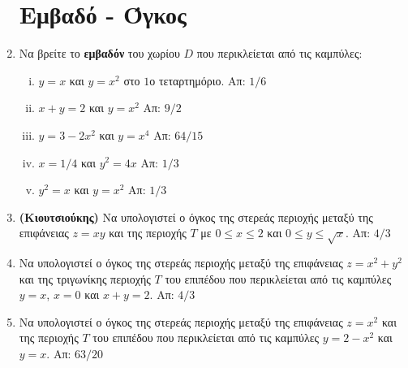 \documentclass[a4paper,table]{report}
\begin{document}
\begin{enumerate}
    \section*{Εμβαδό - Όγκος}

  \item Να βρείτε το \textbf{εμβαδόν} του χωρίου $D$ που περικλείεται από τις καμπύλες: 
    \begin{enumerate}[i)]
      \item $y=x$ και $y=x^2$ στο $1$ο τεταρτημόριο. \hfill Απ: ${1}/{6}$
      \item $x+y=2$ και $y=x^2$ \hfill Απ: ${9}/{2}$
      \item $y=3-2x^2$ και $y=x^4$ \hfill Απ: ${64}/{15}$
      \item $x={1}/{4}$ και $y^2=4x$ \hfill Απ: ${1}/{3}$ %
      \item $y^2=x$ και $y=x^2$ \hfill Απ: ${1}/{3}$ %
    \end{enumerate}

  \item \textbf{(Κιουτσιούκης)} Να υπολογιστεί ο όγκος της στερεάς περιοχής μεταξύ της 
    επιφάνειας $ z=xy $ και της περιοχής $T$ με $ 0 \leq x \leq 2 $ και 
    $ 0 \leq y \leq \sqrt{x} $. 
    \hfill Απ: $ 4/3 $ 





  \item Να υπολογιστεί ο όγκος της στερεάς περιοχής μεταξύ της επιφάνειας 
    $ z=x^{2}+y^{2} $ και της τριγωνίκης περιοχής $T$ του επιπέδου που περικλείεται από 
    τις καμπύλες $ y= x $, $x=0$ και $ x+y=2 $.
    \hfill Απ: $ 4/3 $  

  \item Να υπολογιστεί ο όγκος της στερεάς περιοχής μεταξύ της επιφάνειας 
    $ z=x^{2} $ και της περιοχής $T$ του επιπέδου που περικλείεται από 
    τις καμπύλες $ y= 2-x^{2} $  και $y=x$.
    \hfill Απ: $ 63/20 $ 


\end{enumerate}
\end{document}
